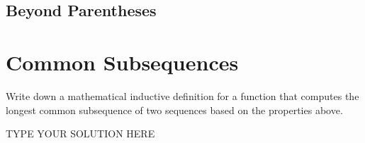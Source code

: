 \documentclass[11pt]{article}
\begin{document}
\subsection{Beyond Parentheses}

\addtocounter{taskNum}{1}
\addtocounter{taskNum}{1}
\addtocounter{taskNum}{1}
\addtocounter{taskNum}{1}
\section{Common Subsequences}

\begin{task}{3}
Write down a mathematical inductive definition for a function that computes the
longest common subsequence of two sequences based on the properties above.
\end{task}

\begin{solution}
TYPE YOUR SOLUTION HERE
\end{solution}


\addtocounter{taskNum}{1}
\addtocounter{taskNum}{1}
\end{document}
